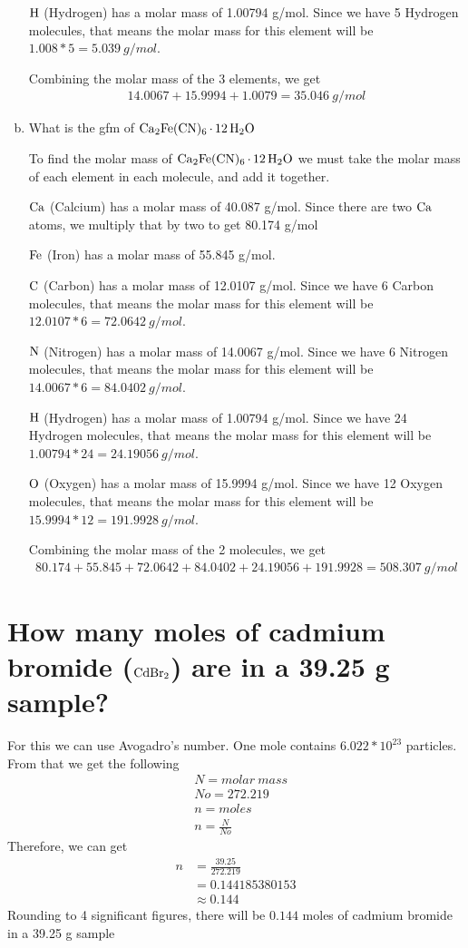 \documentclass[11pt]{article}
\begin{document}
\begin{enumerate}[(a)]
\(\ce{H}\) (Hydrogen) has a molar mass of 1.00794 g/mol. Since we have 5
Hydrogen molecules, that means the molar mass for this element will be
\(1.008*5=5.039\ g/mol\).

Combining the molar mass of the 3 elements, we get
\begin{align*}
14.0067+15.9994+1.0079=35.046\ g/mol
\end{align*}

\item What is the gfm of \(\ce{Ca2Fe(CN)6*12H2O}\)

 To find the molar mass of \(\ce{Ca2Fe(CN)6*12H2O}\) we must take the molar
mass of each element in each molecule, and add it together.

\(\ce{Ca}\) (Calcium) has a molar mass of 40.087 g/mol. Since there are two
  \(\ce{Ca}\) atoms, we multiply that by two to get 80.174 g/mol

\(\ce{Fe}\) (Iron) has a molar mass of 55.845 g/mol.

\(\ce{C}\) (Carbon) has a molar mass of 12.0107 g/mol. Since we have 6
Carbon molecules, that means the molar mass for this element will be
\(12.0107*6=72.0642\ g/mol\).

\(\ce{N}\) (Nitrogen) has a molar mass of 14.0067 g/mol. Since we have 6
Nitrogen molecules, that means the molar mass for this element will be
\(14.0067*6=84.0402\ g/mol\).

\(\ce{H}\) (Hydrogen) has a molar mass of 1.00794 g/mol. Since we have 24
Hydrogen molecules, that means the molar mass for this element will be
\(1.00794*24=24.19056\ g/mol\).

\(\ce{O}\) (Oxygen) has a molar mass of 15.9994 g/mol. Since we have 12
Oxygen molecules, that means the molar mass for this element will be
\(15.9994*12=191.9928\ g/mol\).

Combining the molar mass of the 2 molecules, we get
\begin{align*}
80.174+55.845+72.0642+84.0402+24.19056+191.9928=508.307\ g/mol
\end{align*}
\end{enumerate}

\section{How many moles of cadmium bromide (\(\ce{CdBr2}\)) are in a 39.25 g sample?}
\label{sec:org36ba8cb}
For this we can use Avogadro's number. One mole contains \(6.022*10^{23}\) particles. From that we get the following
\begin{align*}
&N = molar\ mass\\
&No = 272.219\\
&n = moles\\
&n=\frac{N}{No}
\end{align*}
Therefore, we can get
\begin{align*}
n&= \frac{39.25}{272.219}\\
&=0.144185380153\\
&\approx0.144
\end{align*}
Rounding to 4 significant figures, there will be \(0.144\) moles of cadmium bromide in a 39.25 g sample
\end{document}
